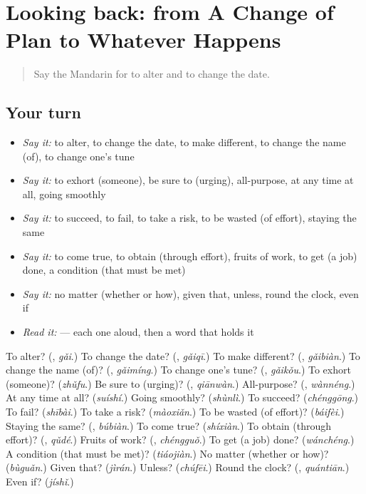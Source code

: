 \section[(dialogue)]{Looking back: from A Change of Plan to Whatever Happens}

\label{lesson:ZH-R396-review-392-396}



\begin{quote}
Say the Mandarin for to alter and to change the date.
\end{quote}

\subsection*{Your turn}
\begin{itemize}
\raggedright
  \item \emph{Say it:} to alter, to change the date, to make different, to change the name (of), to change one's tune
  \item \emph{Say it:} to exhort (someone), be sure to (urging), all-purpose, at any time at all, going smoothly
  \item \emph{Say it:} to succeed, to fail, to take a risk, to be wasted (of effort), staying the same
  \item \emph{Say it:} to come true, to obtain (through effort), fruits of work, to get (a job) done, a condition (that must be met)
  \item \emph{Say it:} no matter (whether or how), given that, unless, round the clock, even if
  \item \emph{Read it:}    — each one aloud, then a word that holds it
\end{itemize}

\begin{tcolorbox}[breakable,colback=teal!4,colframe=teal!35!black,title={Before you move on}]
To alter? (\textbf{}, \emph{gǎi}.) To change the date? (\textbf{}, \emph{gǎiqī}.) To make different? (\textbf{}, \emph{gǎibiàn}.) To change the name (of)? (\textbf{}, \emph{gǎimíng}.) To change one's tune? (\textbf{}, \emph{gǎikǒu}.) To exhort (someone)? (\emph{zhǔfu}.) Be sure to (urging)? (\textbf{}, \emph{qiānwàn}.) All-purpose? (\textbf{}, \emph{wànnéng}.) At any time at all? (\emph{suíshí}.) Going smoothly? (\emph{shùnlì}.) To succeed? (\emph{chénggōng}.) To fail? (\emph{shībài}.) To take a risk? (\emph{màoxiǎn}.) To be wasted (of effort)? (\emph{báifèi}.) Staying the same? (\textbf{}, \emph{búbiàn}.) To come true? (\emph{shíxiàn}.) To obtain (through effort)? (\textbf{}, \emph{qǔdé}.) Fruits of work? (\textbf{}, \emph{chéngguǒ}.) To get (a job) done? (\emph{wánchéng}.) A condition (that must be met)? (\emph{tiáojiàn}.) No matter (whether or how)? (\emph{bùguǎn}.) Given that? (\emph{jìrán}.) Unless? (\emph{chúfēi}.) Round the clock? (\textbf{}, \emph{quántiān}.) Even if? (\emph{jíshǐ}.)
\end{tcolorbox}
